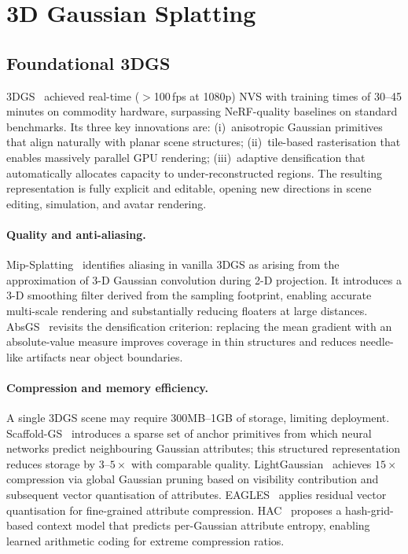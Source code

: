 \section{3D Gaussian Splatting}
\label{sec:3dgs}

\subsection{Foundational 3DGS}

3DGS~\citep{kerbl2023gaussian} achieved real-time ($>$100\,fps at 1080p)
NVS with training times of 30--45 minutes on commodity hardware,
surpassing NeRF-quality baselines on standard benchmarks.
Its three key innovations are:
(i)~anisotropic Gaussian primitives that align naturally with planar scene
structures;
(ii)~tile-based rasterisation that enables massively parallel GPU rendering;
(iii)~adaptive densification that automatically allocates capacity to
under-reconstructed regions.
The resulting representation is fully explicit and editable, opening new
directions in scene editing, simulation, and avatar rendering.

\paragraph{Quality and anti-aliasing.}
Mip-Splatting~\citep{yu2024mipsplatting} identifies aliasing in vanilla 3DGS
as arising from the approximation of 3-D Gaussian convolution during 2-D
projection.
It introduces a 3-D smoothing filter derived from the sampling footprint,
enabling accurate multi-scale rendering and substantially reducing floaters
at large distances.
AbsGS~\citep{ye2024absgs} revisits the densification criterion: replacing
the mean gradient with an absolute-value measure improves coverage in
thin structures and reduces needle-like artifacts near object boundaries.

\paragraph{Compression and memory efficiency.}
A single 3DGS scene may require 300MB--1GB of storage, limiting deployment.
Scaffold-GS~\citep{lu2023scaffoldgs} introduces a sparse set of anchor
primitives from which neural networks predict neighbouring Gaussian attributes;
this structured representation reduces storage by $3$--$5\times$ with
comparable quality.
LightGaussian~\citep{fan2023lightgaussian} achieves $15\times$ compression via
global Gaussian pruning based on visibility contribution and subsequent
vector quantisation of attributes.
EAGLES~\citep{girish2024eagles} applies residual vector quantisation
for fine-grained attribute compression.
HAC~\citep{chen2024hac} proposes a hash-grid-based context model that predicts
per-Gaussian attribute entropy, enabling learned arithmetic coding for
extreme compression ratios.

